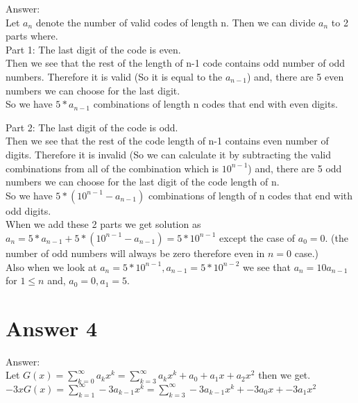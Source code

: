 \documentclass[11pt]{article}
\begin{document}
Answer:\\

    Let $a_n$ denote the number of valid codes of length n. Then we can divide $a_n$ to 2 parts where.\\
    
    Part 1: The last digit of the code is even.\\
    
    Then we see that the rest of the length of n-1 code contains odd number of odd numbers. Therefore it is valid (So it is equal to the $a_{n-1}$) and, there are 5 even numbers we can choose for the last digit.\\
    
    So we have $5*a_{n-1}$ combinations of length n codes that end with even digits.
    
    Part 2: The last digit of the code is odd.\\
    
    Then we see that the rest of the code length of n-1 contains even number of digits. Therefore it is invalid (So we can calculate it by subtracting the valid combinations from all of the combination which is $10^{n-1}$) and, there are 5 odd numbers we can choose for the last digit of the code length of n.\\
    
    So we have $5*(10^{n-1} - a_{n-1})$ combinations of length of n codes that end with odd digits.\\
    
    When we add these 2 parts we get solution as $a_n = 5*a_{n-1} + 5*(10^{n-1} - a_{n-1}) = 5*10^{n-1}$ except the case of $a_0 = 0$. (the number of odd numbers will always be zero therefore even in $n = 0$ case.)\\
    
    Also when we look at $a_n = 5*10^{n-1}, a_{n-1} = 5*10^{n-2}$ we see that $a_n = 10a_{n-1}$
    for $1 \leq n$ and, $a_0 = 0, a_1 = 5$.\\
    
\section*{Answer 4}
Answer:\\

    Let $G(x) = \sum_{k=0}^{\infty} a_kx^k = \sum_{k=3}^{\infty} a_kx^k + a_0 + a_1x + a_2x^2$ then we get.\\
    
    $-3xG(x) = \sum_{k=1}^{\infty} -3a_{k-1}x^k = \sum_{k=3}^{\infty} -3a_{k-1}x^k + -3a_0x + -3a_1x^2$\\
    
\end{document}
